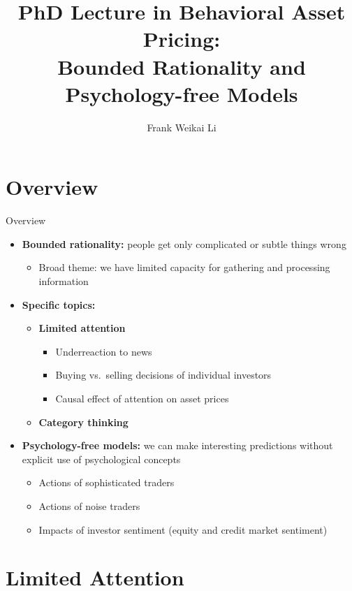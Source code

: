 \documentclass[aspectratio=169, 11pt]{beamer}
\title[EF8083 Lecture 5]{PhD Lecture in Behavioral Asset Pricing:\\ Bounded Rationality and Psychology-free Models}
\author[F.\ W.\ Li]{Frank Weikai Li}
\institute[CityU]{Associate Professor of Finance\\City University of Hong Kong}
\date{}
\begin{document}

\begin{frame}[plain]
\titlepage
\end{frame}

\section{Overview}

\begin{frame}{Overview}
\begin{itemize}
\item \textbf{Bounded rationality:} people get only complicated or subtle things wrong
  \begin{itemize}
  \item Broad theme: we have limited capacity for gathering and processing information
  \end{itemize}
\item \textbf{Specific topics:}
  \begin{itemize}
  \item \textbf{Limited attention}
    \begin{itemize}
    \item Underreaction to news
    \item Buying vs.\ selling decisions of individual investors
    \item Causal effect of attention on asset prices
    \end{itemize}
  \item \textbf{Category thinking}
  \end{itemize}
\item \textbf{Psychology-free models:} we can make interesting predictions without explicit use of psychological concepts
  \begin{itemize}
  \item Actions of sophisticated traders
  \item Actions of noise traders
  \item Impacts of investor sentiment (equity and credit market sentiment)
  \end{itemize}
\end{itemize}
\end{frame}

\section{Limited Attention}
\end{document}
